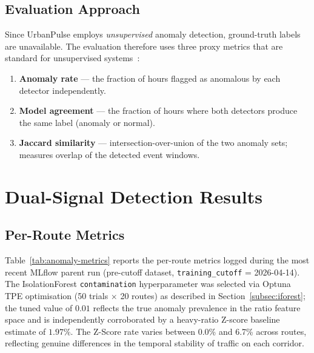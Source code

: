 \subsection{Evaluation Approach}

Since UrbanPulse employs \textit{unsupervised} anomaly detection, ground-truth
labels are unavailable. The evaluation therefore uses three proxy metrics
that are standard for unsupervised systems~\cite{chandola2009anomaly}:

\begin{enumerate}
  \item \textbf{Anomaly rate} --- the fraction of hours flagged as anomalous
        by each detector independently.
  \item \textbf{Model agreement} --- the fraction of hours where both
        detectors produce the same label (anomaly or normal).
  \item \textbf{Jaccard similarity} --- intersection-over-union of the two
        anomaly sets; measures overlap of the detected event windows.
\end{enumerate}

\section{Dual-Signal Detection Results}
\label{sec:detection-results}

\subsection{Per-Route Metrics}

Table~\ref{tab:anomaly-metrics} reports the per-route metrics logged during
the most recent MLflow parent run (pre-cutoff dataset, \texttt{training\_cutoff}
= 2026-04-14).
The IsolationForest \texttt{contamination} hyperparameter was selected via
Optuna TPE optimisation (50 trials $\times$ 20 routes) as described in
Section~\ref{subsec:iforest}; the tuned value of $0.01$ reflects the true
anomaly prevalence in the ratio feature space and is independently corroborated
by a heavy-ratio Z-score baseline estimate of $1.97\%$.
The Z-Score rate varies between 0.0\% and 6.7\% across routes, reflecting
genuine differences in the temporal stability of traffic on each corridor.

